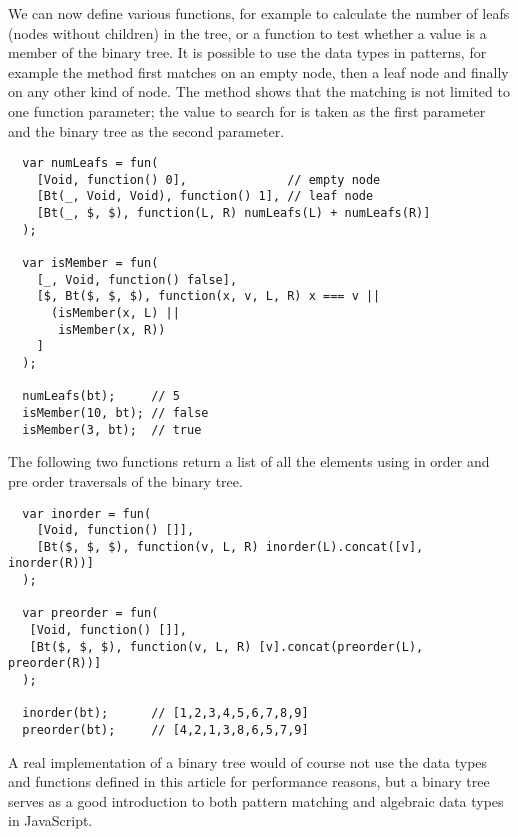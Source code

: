 We can now define various functions, for example to calculate the number of leafs (nodes without children) in the tree, or a function to test whether a value is a member of the binary tree. It is possible to use the data types in patterns, for example the  method first matches on an empty node, then a leaf node and finally on any other kind of node. The  method shows that the matching is not limited to one function parameter; the value to search for is taken as the first parameter and the binary tree as the second parameter.
\begin{verbatim}
  var numLeafs = fun(
    [Void, function() 0],              // empty node
    [Bt(_, Void, Void), function() 1], // leaf node
    [Bt(_, $, $), function(L, R) numLeafs(L) + numLeafs(R)]
  );

  var isMember = fun(
    [_, Void, function() false],
    [$, Bt($, $, $), function(x, v, L, R) x === v || 
	  (isMember(x, L) || 
       isMember(x, R))
    ]
  );

  numLeafs(bt);     // 5
  isMember(10, bt); // false
  isMember(3, bt);  // true
\end{verbatim}
The following two functions return a list of all the elements using in order and pre order traversals of the binary tree.
\begin{verbatim}
  var inorder = fun(
    [Void, function() []],
    [Bt($, $, $), function(v, L, R) inorder(L).concat([v], inorder(R))]
  );

  var preorder = fun(
   [Void, function() []],
   [Bt($, $, $), function(v, L, R) [v].concat(preorder(L), preorder(R))]
  );

  inorder(bt);      // [1,2,3,4,5,6,7,8,9]
  preorder(bt);     // [4,2,1,3,8,6,5,7,9]
\end{verbatim}
A real implementation of a binary tree would of course not use the data types and functions defined in this article for performance reasons, but a binary tree serves as a good introduction to both pattern matching and algebraic data types in JavaScript.
